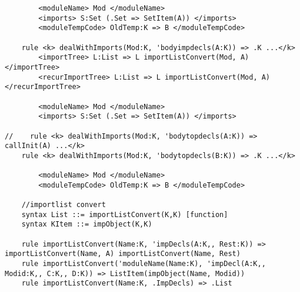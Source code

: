 \begin{lstlisting}
        <moduleName> Mod </moduleName>
        <imports> S:Set (.Set => SetItem(A)) </imports>
        <moduleTempCode> OldTemp:K => B </moduleTempCode>

    rule <k> dealWithImports(Mod:K, 'bodyimpdecls(A:K)) => .K ...</k>
        <importTree> L:List => L importListConvert(Mod, A) </importTree>
        <recurImportTree> L:List => L importListConvert(Mod, A) </recurImportTree>

        <moduleName> Mod </moduleName>
        <imports> S:Set (.Set => SetItem(A)) </imports>

//    rule <k> dealWithImports(Mod:K, 'bodytopdecls(A:K)) => callInit(A) ...</k>
    rule <k> dealWithImports(Mod:K, 'bodytopdecls(B:K)) => .K ...</k>

        <moduleName> Mod </moduleName>
        <moduleTempCode> OldTemp:K => B </moduleTempCode>

    //importlist convert
    syntax List ::= importListConvert(K,K) [function]
    syntax KItem ::= impObject(K,K)

    rule importListConvert(Name:K, 'impDecls(A:K,, Rest:K)) => importListConvert(Name, A) importListConvert(Name, Rest)
    rule importListConvert('moduleName(Name:K), 'impDecl(A:K,, Modid:K,, C:K,, D:K)) => ListItem(impObject(Name, Modid))
    rule importListConvert(Name:K, .ImpDecls) => .List
\end{lstlisting}

